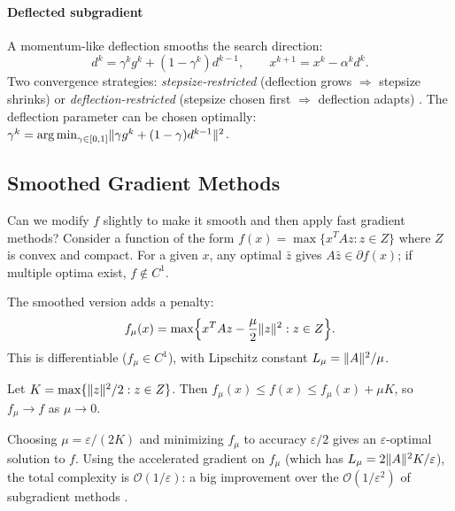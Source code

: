 \paragraph{Deflected subgradient}

A momentum-like deflection smooths the search direction:
\begin{equation}\label{eq:deflected-subgradient}
	d^k = \gamma^k g^k + (1 - \gamma^k) d^{k-1},
	\qquad
	x^{k+1} = x^k - \alpha^k d^k.
\end{equation}
Two convergence strategies: \emph{stepsize-restricted} (deflection grows $\Rightarrow$ stepsize shrinks) or \emph{deflection-restricted} (stepsize chosen first $\Rightarrow$ deflection adapts) \cite{dantonio2009}.
The deflection parameter can be chosen optimally: $\gamma^k = \operatorname*{arg\,min}_{\gamma \in [0,1]} \lVert\gamma g^k + (1 - \gamma) d^{k-1}\rVert^2$.


\subsection{Smoothed Gradient Methods}\label{sec:smoothing}

Can we modify $f$ slightly to make it smooth and then apply fast gradient methods?
Consider a function of the form $f(x) = \max\{x^T A z : z \in Z\}$ where $Z$ is convex and compact.
For a given $x$, any optimal $\bar{z}$ gives $A\bar{z} \in \partial f(x)$; if multiple optima exist, $f \notin C^1$.

The smoothed version adds a penalty:
\begin{equation}\label{eq:smoothed-objective}
	f_\mu(x) = \max\Bigl\{x^T A z - \frac{\mu}{2}\lVert z\rVert^2 : z \in Z\Bigr\}.
\end{equation}
This is differentiable ($f_\mu \in C^1$), with Lipschitz constant $L_\mu = \lVert A\rVert^2 / \mu$.

\begin{theorem}\label{thm:smoothing}
	Let $K = \max\{\lVert z\rVert^2/2 : z \in Z\}$.
	Then $f_\mu(x) \leq f(x) \leq f_\mu(x) + \mu K$, so $f_\mu \to f$ as $\mu \to 0$.
\end{theorem}

Choosing $\mu = \varepsilon/(2K)$ and minimizing $f_\mu$ to accuracy $\varepsilon/2$ gives an $\varepsilon$-optimal solution to $f$.
Using the accelerated gradient on $f_\mu$ (which has $L_\mu = 2\lVert A\rVert^2 K / \varepsilon$), the total complexity is $\mathcal{O}(1/\varepsilon)$: a big improvement over the $\mathcal{O}(1/\varepsilon^2)$ of subgradient methods \cite{nesterov2005}.

